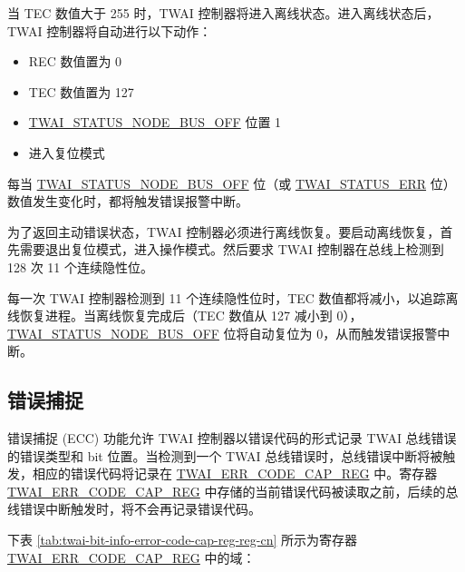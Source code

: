 \documentclass[main\_\_CN.tex]{subfiles}
\begin{document}
当 TEC 数值大于 255 时，TWAI 控制器将进入离线状态。进入离线状态后，TWAI 控制器将自动进行以下动作：

\begin{itemize}
    \item REC 数值置为 0
    \item TEC 数值置为 127
    \item \hyperref[fielddesc:TWAISTATUSNODEBUSOFF]{TWAI\_STATUS\_NODE\_BUS\_OFF} 位置 1
    \item 进入复位模式
\end{itemize}

每当 \hyperref[fielddesc:TWAISTATUSNODEBUSOFF]{TWAI\_STATUS\_NODE\_BUS\_OFF} 位（或 \hyperref[fielddesc:TWAISTATUSERR]{TWAI\_STATUS\_ERR} 位）数值发生变化时，都将触发错误报警中断。

为了返回主动错误状态，TWAI 控制器必须进行离线恢复。要启动离线恢复，首先需要退出复位模式，进入操作模式。然后要求 TWAI 控制器在总线上检测到 128 次 11 个连续隐性位。

每一次 TWAI 控制器检测到 11 个连续隐性位时，TEC 数值都将减小，以追踪离线恢复进程。当离线恢复完成后（TEC 数值从 127 减小到 0），\hyperref[fielddesc:TWAISTATUSNODEBUSOFF]{TWAI\_STATUS\_NODE\_BUS\_OFF} 位将自动复位为 0，从而触发错误报警中断。

\subsection{错误捕捉}

错误捕捉 (ECC) 功能允许 TWAI 控制器以错误代码的形式记录 TWAI 总线错误的错误类型和 bit 位置。当检测到一个 TWAI 总线错误时，总线错误中断将被触发，相应的错误代码将记录在 \hyperref[regdesc:TWAIERRCODECAPREG]{TWAI\_ERR\_CODE\_CAP\_REG} 中。寄存器 \hyperref[regdesc:TWAIERRCODECAPREG]{TWAI\_ERR\_CODE\_CAP\_REG} 中存储的当前错误代码被读取之前，后续的总线错误中断触发时，将不会再记录错误代码。


下表 \ref{tab:twai-bit-info-error-code-cap-reg-reg-cn} 所示为寄存器 \hyperref[regdesc:TWAIERRCODECAPREG]{TWAI\_ERR\_CODE\_CAP\_REG} 中的域：
\end{document}
